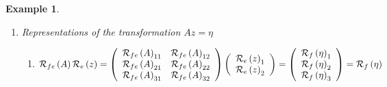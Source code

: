 \documentclass[aps,preprint]{revtex4}%
\newtheorem{example}[theorem]{Example}
\begin{document}
\begin{example}
\begin{enumerate}
\begin{enumerate}
\begin{enumerate}
\item[*] representations
\begin{align}
\mathcal{R}_{ef}\left(  \mathfrak{i}_{ef}\right)   &  =\left(
\begin{array}
[c]{ccc}%
1 & 0 & 0\\
0 & 1 & 0
\end{array}
\right) \\
\mathcal{R}_{fe}\left(  \mathfrak{i}_{fe}\right)   &  =\mathcal{R}_{fe}\left(
\mathfrak{i}_{ef}^{-1}\right)  =\left(
\begin{array}
[c]{cc}%
1 & 0\\
0 & 1\\
0 & 0
\end{array}
\right)  .
\end{align}

\end{enumerate}
\end{enumerate}

\item Representations of the transformation $Az=\eta\ $

\begin{enumerate}
\item
\begin{equation}
\mathcal{R}_{fe}\left(  A\right)  \mathcal{R}_{e}\left(  z\right)  =\left(
\begin{array}
[c]{cc}%
\mathcal{R}_{fe}\left(  A\right)  _{11} & \mathcal{R}_{fe}\left(  A\right)
_{12}\\
\mathcal{R}_{fe}\left(  A\right)  _{21} & \mathcal{R}_{fe}\left(  A\right)
_{22}\\
\mathcal{R}_{fe}\left(  A\right)  _{31} & \mathcal{R}_{fe}\left(  A\right)
_{32}%
\end{array}
\right)  \left(
\begin{array}
[c]{c}%
\mathcal{R}_{e}\left(  z\right)  _{1}\\
\mathcal{R}_{e}\left(  z\right)  _{2}%
\end{array}
\right)  =\left(
\begin{array}
[c]{c}%
\mathcal{R}_{f}\left(  \eta\right)  _{1}\\
\mathcal{R}_{f}\left(  \eta\right)  _{2}\\
\mathcal{R}_{f}\left(  \eta\right)  _{3}%
\end{array}
\right)  =\mathcal{R}_{f}\left(  \eta\right)
\end{equation}



\end{enumerate}
\end{enumerate}
\end{example}
\end{document}
